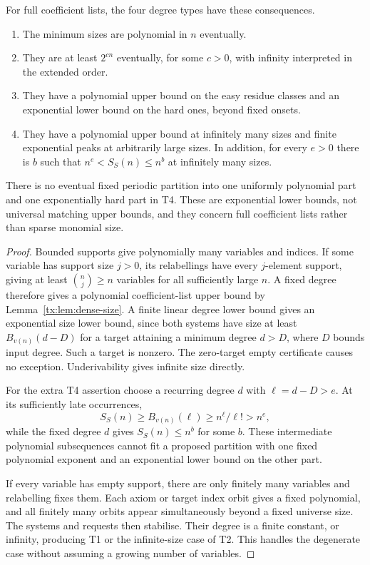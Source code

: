 \begin{corollary}\label{tx:cor:dense-types}
For full coefficient lists, the four degree types have these consequences.
\begin{enumerate}[label=\textup{T\arabic*.}]
\item The minimum sizes are polynomial in $n$ eventually.
\item They are at least $2^{cn}$ eventually, for some $c>0$, with
infinity interpreted in the extended order.
\item They have a polynomial upper bound on the easy residue classes
and an exponential lower bound on the hard ones, beyond fixed onsets.
\item They have a polynomial upper bound at infinitely many sizes and
finite exponential peaks at arbitrarily large sizes. In addition, for
every $e>0$ there is $b$ such that $n^e<S_S(n)\le n^b$ at infinitely
many sizes.
\end{enumerate}
There is no eventual fixed periodic partition into one uniformly
polynomial part and one exponentially hard part in T4. These are
exponential lower bounds, not universal matching upper bounds, and they
concern full coefficient lists rather than sparse monomial size.
\end{corollary}
\begin{proof}
Bounded supports give polynomially many variables and indices. If some
variable has support size $j>0$, its relabellings have every $j$-element
support, giving at least $\binom nj\ge n$ variables for all sufficiently
large $n$. A fixed degree therefore gives a polynomial coefficient-list
upper bound by Lemma~\ref{tx:lem:dense-size}. A finite linear degree
lower bound gives an exponential size lower bound, since both systems
have size at least $B_{v(n)}(d-D)$ for a target attaining a minimum
degree $d>D$, where $D$ bounds input degree. Such a target is nonzero.
The zero-target empty certificate causes no exception. Underivability
gives infinite size directly.

For the extra T4 assertion choose a recurring degree $d$ with
$\ell=d-D>e$. At its sufficiently late occurrences,
\[
                 S_S(n)\ge B_{v(n)}(\ell)
                         \ge n^\ell/\ell!>n^e,
\]
while the fixed degree $d$ gives $S_S(n)\le n^b$ for some $b$.
These intermediate polynomial subsequences cannot fit a proposed
partition with one fixed polynomial exponent and an exponential lower
bound on the other part.

If every variable has empty support, there are only finitely many
variables and relabelling fixes them. Each axiom or target index orbit
gives a fixed polynomial, and all finitely many orbits appear
simultaneously beyond a fixed universe size. The systems and requests then
stabilise. Their degree is a finite constant, or infinity, producing
T1 or the infinite-size case of T2. This handles the degenerate case
without assuming a growing number of variables.
\end{proof}

